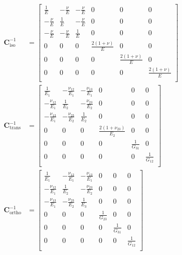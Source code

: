 \begin{align}
\boldsymbol{C}^{-1}_{\text{iso}} &= 
\begin{bmatrix}
    \frac{1}{E} & -\frac{\nu}{E} & -\frac{\nu}{E} & 0 & 0 & 0 \\
    -\frac{\nu}{E}& \frac{1}{E} & -\frac{\nu}{E} & 0 & 0 & 0 \\
    -\frac{\nu}{E} & -\frac{\nu}{E} & \frac{1}{E} & 0 & 0 & 0 \\
    0 & 0 & 0 & \frac{2(1+\nu)}{E} & 0 & 0 \\
    0 & 0 & 0 & 0 & \frac{2(1+\nu)}{E} & 0 \\
    0 & 0 & 0 & 0 & 0 & \frac{2(1+\nu)}{E} \\
\end{bmatrix}\\
\boldsymbol{C}^{-1}_{\text{trans}} &= 
\begin{bmatrix}
    \frac{1}{E_{1}} & -\frac{\nu_{12}}{E_{1}} & -\frac{\nu_{13}}{E_{1}} & 0 & 0 & 0 \\
    -\frac{\nu_{12}}{E_{1}}& \frac{1}{E_{2}} & -\frac{\nu_{23}}{E_{2}} & 0 & 0 & 0 \\
    -\frac{\nu_{13}}{E_{1}} & -\frac{\nu_{23}}{E_{2}} & \frac{1}{E_{2}} & 0 & 0 & 0 \\
    0 & 0 & 0 & \frac{2(1+\nu_{23})}{E_{2}} & 0 & 0 \\
    0 & 0 & 0 & 0 & \frac{1}{G_{31}} & 0 \\
    0 & 0 & 0 & 0 & 0 & \frac{1}{G_{12}} \\
\end{bmatrix}\\
\boldsymbol{C}^{-1}_{\text{ortho}} &= 
\begin{bmatrix}
    \frac{1}{E_{1}} & -\frac{\nu_{12}}{E_{1}} & -\frac{\nu_{13}}{E_{1}} & 0 & 0 & 0 \\
    -\frac{\nu_{12}}{E_{1}}& \frac{1}{E_{2}} & -\frac{\nu_{23}}{E_{2}} & 0 & 0 & 0 \\
    -\frac{\nu_{13}}{E_{1}} & -\frac{\nu_{23}}{E_{2}} & \frac{1}{E_{3}} & 0 & 0 & 0 \\
    0 & 0 & 0 & \frac{1}{G_{23}} & 0 & 0 \\
    0 & 0 & 0 & 0 & \frac{1}{G_{31}} & 0 \\
    0 & 0 & 0 & 0 & 0 & \frac{1}{G_{12}} \\
\end{bmatrix}
\end{align}

